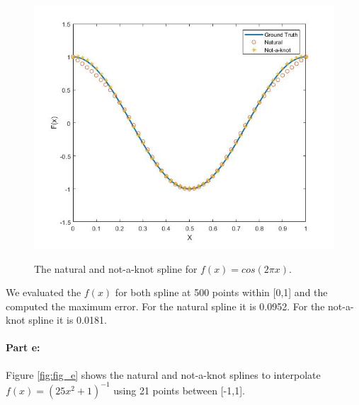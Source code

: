 \begin{figure}[H]
 \centering  
   {\includegraphics[width=0.98\linewidth]{fig/prob2_d.jpg}}   
  \caption{The natural and not-a-knot spline for $f(x)=cos(2\pi x)$.}
   \label{fig:fig_d}
\end{figure} 

We evaluated the $f(x)$ for both spline at 500 points within [0,1] and the computed the maximum error. For the natural spline it is 0.0952. For the not-a-knot spline it is 0.0181. 

\paragraph{Part e:} Figure \ref{fig:fig_e} shows the natural and not-a-knot splines to interpolate $f(x)=(25x^2+1)^{-1}$ using 21 points between [-1,1].

